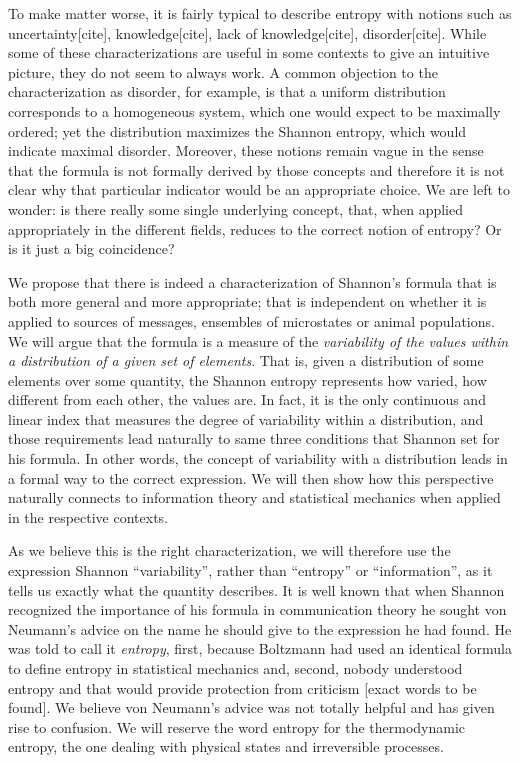\documentclass{article}
\begin{document}
To make matter worse, it is fairly typical to describe entropy with notions such as uncertainty[cite], knowledge[cite], lack of knowledge[cite], disorder[cite]. While some of these characterizations are useful in some contexts to give an intuitive picture, they do not seem to always work. A common objection to the characterization as disorder, for example, is that a uniform distribution corresponds to a homogeneous system, which one would expect to be maximally ordered; yet the distribution maximizes the Shannon entropy, which would indicate maximal disorder. Moreover, these notions remain vague in the sense that the formula is not formally derived by those concepts and therefore it is not clear why that particular indicator would be an appropriate choice. We are left to wonder: is there really some single underlying concept, that, when applied appropriately in the different fields, reduces to the correct notion of entropy? Or is it just a big coincidence?

We propose that there is indeed a characterization of Shannon's formula that is both more general and more appropriate; that is independent on whether it is applied to sources of messages, ensembles of microstates or animal populations. We will argue that the formula is a measure of the \emph{variability of the values within a distribution of a given set of elements}. That is, given a distribution of some elements over some quantity, the Shannon entropy represents how varied, how different from each other, the values are. In fact, it is the only continuous and linear index that measures the degree of variability within a distribution, and those requirements lead naturally to same three conditions that Shannon set for his formula. In other words, the concept of variability with a distribution leads in a formal way to the correct expression. We will then show how this perspective naturally connects to information theory and statistical mechanics when applied in the respective contexts. 

As we believe this is the right characterization, we will therefore use the expression Shannon ``variability'', rather than ``entropy'' or ``information'', as it tells us exactly what the quantity describes. It is well known that when Shannon recognized the importance of his formula in communication theory he sought von Neumann's advice on the name he should give to the expression he had found. He was told to call it \emph{entropy}, first, because Boltzmann had used an identical formula to define entropy in statistical mechanics and, second, nobody understood entropy and that would provide protection from criticism [exact words to be found]. We believe von Neumann's advice was not totally helpful and has given rise to confusion. We will reserve the word entropy for the thermodynamic entropy, the one dealing with physical states and irreversible processes.
\end{document}
